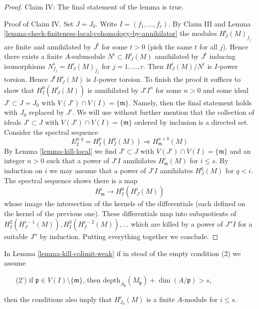 \begin{proof}
\medskip\noindent
Claim IV: The final statement of the lemma is true.

\medskip\noindent
Proof of Claim IV. Set $J = J_0$. Write $I = (f_1, \ldots, f_r)$.
By Claim III and
Lemma \ref{lemma-check-finiteness-local-cohomology-by-annihilator}
the modules $H^i_J(M)_{f_j}$ are finite and annihilated by
$J^t$ for some $t > 0$ (pick the same $t$ for all $j$).
Hence there exists a finite $A$-submodule $N^i \subset H^i_J(M)$
annihilated by $J^t$ inducing isomorphisms $N^i_{f_j} = H^i_J(M)_{f_j}$
for $j = 1, \ldots, r$. Then $H^i_J(M)/N^i$ is $I$-power torsion.
Hence $J^t H^i_J(M)$ is $I$-power torsion. To finish the proof
it suffices to show that $H^0_I(H^i_J(M))$ is annihilated by
$J' I^n$ for some $n > 0$ and some ideal $J' \subset J = J_0$ with
$V(J') \cap V(I) = \{\mathfrak m\}$. Namely, then the final
statement holds with $J_0$ replaced by $J'$. We will use without
further mention that the collection of ideals
$J' \subset J$ with $V(J') \cap V(I) = \{\mathfrak m\}$
ordered by inclusion is a directed set.
Consider the spectral sequence
$$
E_2^{p, q} = H^p_I(H^q_J(M)) \Rightarrow H^{a + b}_\mathfrak m(M)
$$
By Lemma \ref{lemma-kill-local} we find $J' \subset J$
with $V(J') \cap V(I) = \{\mathfrak m\}$ and an integer $n > 0$
such that a power of $J'I$ annihilates $H^i_\mathfrak m(M)$
for $i \leq s$. By induction on $i$ we may assume that a power
of $J' I$ annihilates $H^q_J(M)$ for $q < i$.
The spectral sequence shows there is a map
$$
H^i_\mathfrak m \to H^0_I(H^i_J(M))
$$
whose image the intersection of the kernels of the differentials
(each defined on the kernel of the previous one). These
differentials map into subquotients of
$H^2_I(H^{i - 1}_J(M)), H^3_I(H^{i - 2}_J(M)), \ldots$
which are killed by a power of $J''I$ for a suitable $J''$
by induction. Putting everything together we conclude.
\end{proof}

\begin{lemma}
\label{lemma-kill-colimit}
In Lemma \ref{lemma-kill-colimit-weak} if in stead of the empty
condition (2) we assume
\begin{enumerate}
\item[(2')] if $\mathfrak p \in V(I) \setminus \{\mathfrak m\}$, then
$\text{depth}_{A_\mathfrak p}(M_\mathfrak p) + \dim(A/\mathfrak p) > s$,
\end{enumerate}
then the conditions also imply that $H^i_{J_0}(M)$ is a finite
$A$-module for $i \leq s$.
\end{lemma}

